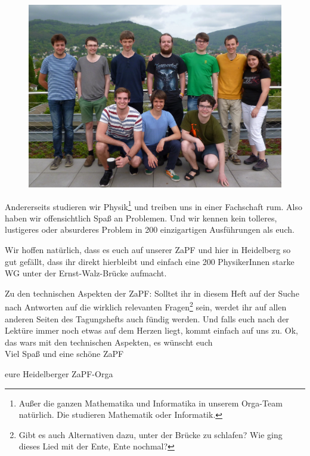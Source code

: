 \begin{figure}
\includegraphics[width=.65\textwidth]{media/orga}
\end{figure}

Andererseits studieren wir Physik\footnote{Außer die ganzen Mathematika und Informatika in unserem Orga-Team natürlich. Die studieren Mathematik oder Informatik.} und treiben uns in einer Fachschaft rum. Also haben wir offensichtlich Spaß an Problemen. Und wir kennen kein tolleres, lustigeres oder absurderes Problem in 200 einzigartigen Ausführungen als euch.

Wir hoffen natürlich, dass es euch auf unserer ZaPF und hier in Heidelberg so gut gefällt, dass ihr direkt hierbleibt und einfach eine 200 PhysikerInnen starke WG unter der Ernst-Walz-Brücke aufmacht.

Zu den technischen Aspekten der ZaPF: Solltet ihr in diesem Heft auf der Suche nach Antworten auf die wirklich relevanten Fragen\footnote{Gibt es auch Alternativen dazu, unter der Brücke zu schlafen? Wie ging dieses Lied mit der Ente, Ente nochmal?} sein, werdet ihr auf allen anderen Seiten des Tagungshefts auch fündig werden. Und falls euch nach der Lektüre immer noch etwas auf dem Herzen liegt, kommt einfach auf uns zu. Ok, das wars mit den technischen Aspekten, es wünscht euch\\

Viel Spaß und eine schöne ZaPF

eure Heidelberger ZaPF-Orga
